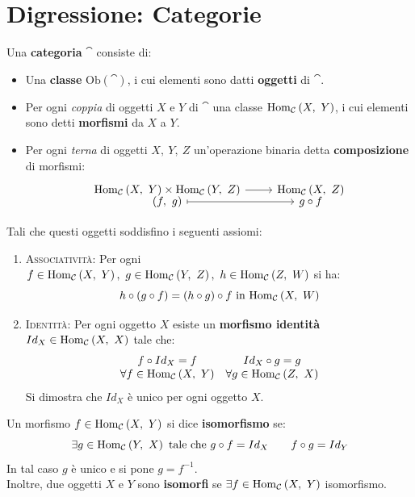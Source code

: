 \section{Digressione: Categorie}
\begin{define}
	Una \textbf{categoria} $\cat$ consiste di:
	\begin{itemize}
		\item Una \textbf{classe} $\mathrm{Ob}\left(\cat\right)$, i cui elementi sono datti \textbf{oggetti} di $\cat$.
		\item Per ogni \textit{coppia} di oggetti $X$ e $Y$ di $\cat$ una classe $\mathrm{Hom}_{\mathcal{C}}\left(X,\ Y\right)$, i cui elementi sono detti \textbf{morfismi} da $X$ a $Y$.
		\item Per ogni \textit{terna} di oggetti $X,\ Y,\ Z$ un'operazione binaria detta \textbf{composizione} di morfismi:
		\begin{equation}
			\funztot{\ }{\homo{\cat}{X}{Y}\times \homo{\cat}{Y}{Z}}{\homo{\cat}{X}{Z}}{\left(f,\ g\right)}{g\circ f}
		\end{equation}
	\end{itemize}
Tali che questi oggetti soddisfino i seguenti assiomi:
\begin{enumerate}
	\item \textsc{Associatività}: Per ogni $f\in\homo{\cat}{X}{Y},\ g\in\homo{\cat}{Y}{Z},\ h\in\homo{\cat}{Z}{W}$ si ha:
	\begin{equation}
		h\circ\left(g\circ f\right)=\left(h\circ g\right)\circ f\text{ in }\mathrm{Hom}_{\mathcal{C}}\left(X,\ W\right)
	\end{equation}
	\item \textsc{Identità}: Per ogni oggetto $X$ esiste un \textbf{morfismo identità} $Id_{X}\in\mathrm{Hom}_{\mathcal{C}}\left(X,\ X\right)$ tale che:
	\begin{equation}
		\begin{array}{cc}
			f\circ Id_X=f&Id_X\circ g=g\\
			\forall f\in\mathrm{Hom}_{\mathcal{C}}\left(X,\ Y\right)&\forall g\in\mathrm{Hom}_{\mathcal{C}}\left(Z,\ X\right)
		\end{array}
	\end{equation}
Si dimostra che $Id_X$ è unico per ogni oggetto $X$.
\end{enumerate} 
\end{define}
\begin{define} 
	Un morfismo $f\in\mathrm{Hom}_{\mathcal{C}}\left(X,\ Y\right)$ si dice \textbf{isomorfismo} se:
	\begin{equation}
		 \exists g\in \mathrm{Hom}_{\mathcal{C}}\left(Y,\ X\right) \text{ tale che } g\circ f=Id_X\qquad f\circ g=Id_Y
	\end{equation}
In tal caso $g$ è unico e si pone $g=f^{-1}$.\\
Inoltre, due oggetti $X$ e $Y$ sono \textbf{isomorfi} se $\exists f\in \mathrm{Hom}_{\mathcal{C}}\left(X,\ Y\right)$ isomorfismo.
\end{define}
